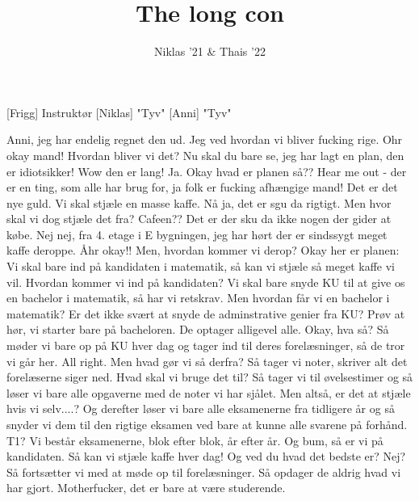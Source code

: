\documentclass[a4paper,11pt]{article}
\title{The long con}
\author{Niklas '21 \& Thais '22}
\begin{document}
\maketitle

\begin{roles}
[Frigg] Instruktør
[Niklas] "Tyv"
[Anni] "Tyv"
\end{roles}

\begin{sketch}
 Anni, jeg har endelig regnet den ud. Jeg ved hvordan vi bliver fucking rige.
 Ohr okay mand! Hvordan bliver vi det?
 Nu skal du bare se, jeg har lagt en plan, den er idiotsikker!
 Wow den er lang!
 Ja.
 Okay hvad er planen så??
 Hear me out - der er en ting, som alle har brug for, ja folk er fucking afhængige mand! Det er det nye guld. Vi skal stjæle en masse kaffe.
 Nå ja, det er sgu da rigtigt. Men hvor skal vi dog stjæle det fra? Cafeen?? Det er der sku da ikke nogen der gider at købe.
 Nej nej, fra 4. etage i E bygningen, jeg har hørt der er sindssygt meget kaffe deroppe.
 Åhr okay!! Men, hvordan kommer vi derop?
 Okay her er planen: Vi skal bare ind på kandidaten i matematik, så kan vi stjæle så meget kaffe vi vil.
 Hvordan kommer vi ind på kandidaten?
 Vi skal bare snyde KU til at give os en bachelor i matematik, så har vi retskrav.
 Men hvordan får vi en bachelor i matematik? Er det ikke svært at snyde de adminstrative genier fra KU?
 Prøv at hør, vi starter bare på bacheloren. De optager alligevel alle.
 Okay, hva så?
 Så møder vi bare op på KU hver dag og tager ind til deres forelæsninger, så de tror vi går her.
 All right. Men hvad gør vi så derfra?
 Så tager vi noter, skriver alt det forelæserne siger ned.
 Hvad skal vi bruge det til?
 Så tager vi til øvelsestimer og så løser vi bare alle opgaverne med de noter vi har sjålet. 
 Men altså, er det at stjæle hvis vi selv....? 
 Og derefter løser vi bare alle eksamenerne fra tidligere år og så snyder vi dem til den rigtige eksamen ved bare at kunne alle svarene på forhånd. 
 T1? 
 Vi består eksamenerne, blok efter blok, år efter år. Og bum, så er vi på kandidaten. Så kan vi stjæle kaffe hver dag! Og ved du hvad det bedste er?
 Nej?
 Så fortsætter vi med at møde op til forelæsninger. Så opdager de aldrig hvad vi har gjort.
 Motherfucker, det er bare at være studerende.
\end{sketch}
\end{document}
